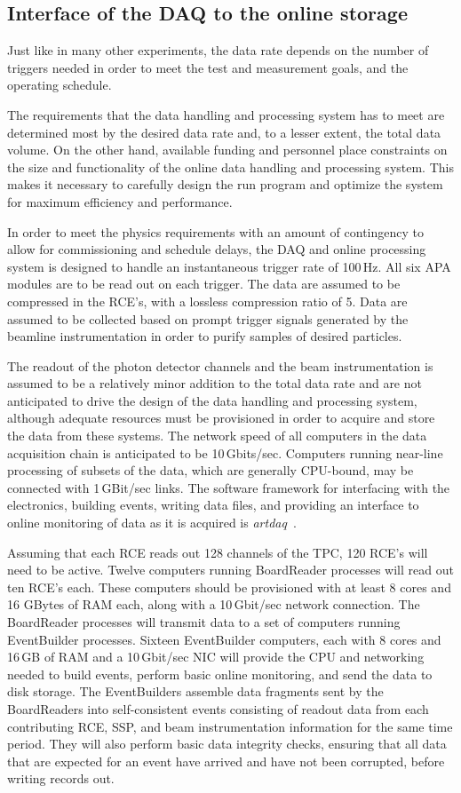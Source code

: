 \subsection{Interface of the DAQ to the online storage}
Just like in many other experiments, the \pd data rate depends on the number of
triggers needed in order to meet the test and measurement goals, and
the operating schedule.

The requirements that the data handling and processing system has to meet are
determined most  by the desired data rate and, to a lesser extent, the total data volume.
On the other hand, available funding and personnel place
constraints on the size and functionality of the online data handling
and processing system. This makes it necessary to carefully design
the run program and optimize the system for maximum efficiency and
performance.

In order to meet the physics requirements with an amount of
contingency to allow for commissioning and schedule delays, the DAQ
and online processing system is designed to handle an instantaneous
trigger rate of 100\,Hz.  All six APA modules are to be read out on
each trigger.  The data are assumed to be compressed in the RCE's,
with a lossless compression ratio of 5.  Data are assumed to be
collected based on prompt trigger signals generated by the beamline
instrumentation in order to purify samples of desired particles.

The readout of the photon detector channels and the beam
instrumentation is assumed to be a relatively minor addition to the
total data rate and are not anticipated to drive the design of the
data handling and processing system, although adequate resources must
be provisioned in order to acquire and store the data from these
systems.  The network speed of all computers in the data acquisition
chain is anticipated to be 10\,Gbits/sec.  Computers running near-line
processing of subsets of the data, which are generally CPU-bound, may
be connected with 1\,GBit/sec links.  The software framework for
interfacing with the electronics, building events, writing data files,
and providing an interface to online monitoring of data as it is
acquired is {\it artdaq}~\cite{artdaq}.

Assuming that each RCE reads out 128 channels of the TPC, 120 RCE's
will need to be active.  Twelve computers running BoardReader
processes will read out ten RCE's each.  These computers should be
provisioned with at least 8 cores and 16 GBytes of RAM each, along
with a 10\,Gbit/sec network connection.  The BoardReader processes will
transmit data to a set of computers running EventBuilder processes.
Sixteen EventBuilder computers, each with 8 cores and 16\,GB of RAM
and a 10\,Gbit/sec NIC will provide the CPU and networking needed to
build events, perform basic online monitoring, and send the data to
disk storage.  The EventBuilders assemble data fragments sent by the
BoardReaders into self-consistent events consisting of readout data
from each contributing RCE, SSP, and beam instrumentation information
for the same time period.  They will also perform basic data integrity
checks, ensuring that all data that are expected for an event have
arrived and have not been corrupted, before writing records out.

